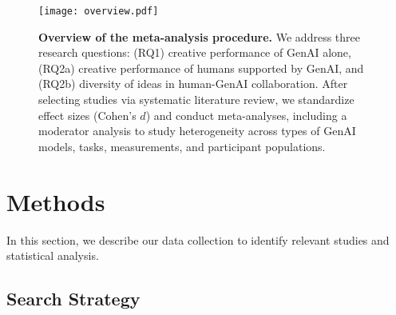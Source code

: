 \documentclass[manuscript, screen, review, acmsmall, anonymous]{acmart}
\newcommand{\TODO}[1]{\textcolor{red}{#1}}
\begin{document}
\begin{figure}
  \centering
  \texttt{[image: overview.pdf]}
  \caption{\textbf{Overview of the meta-analysis procedure.} We address three research questions: (RQ1) creative performance of GenAI alone, (RQ2a) creative performance of humans supported by GenAI, and (RQ2b) diversity of ideas in human-GenAI collaboration. After selecting studies via systematic literature review, we standardize effect sizes (Cohen's $d$) and conduct meta-analyses, including a moderator analysis to study heterogeneity across types of GenAI models, tasks, measurements, and participant populations.}
\end{figure}


\section{Methods}
\label{sec:Methods}

In this section, we describe our data collection to identify relevant studies and statistical analysis. 

\subsection{Search Strategy}



    
\end{document}
